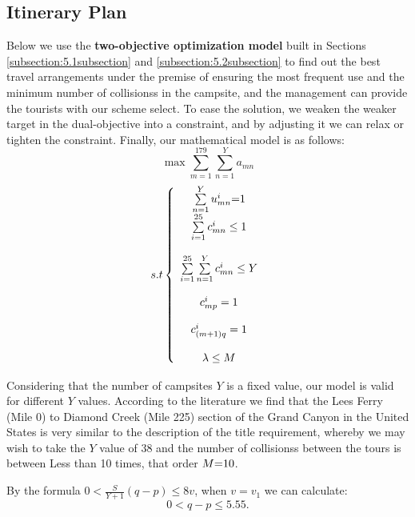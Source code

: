\subsection{Itinerary Plan}
\noindent Below we use the \textbf{two-objective optimization model} built in Sections \ref{subsection:5.1subsection} and \ref  {subsection:5.2subsection} to find out the best travel arrangements under the premise of ensuring the most frequent use and the minimum number of collisionss in the campsite, and the management can provide the tourists with our scheme select. To ease the solution, we weaken the weaker target in the dual-objective into a constraint, and by adjusting it we can relax or tighten the constraint. Finally, our mathematical model is as follows:
	\begin{equation}
	\max \sum\limits_{m = 1}^{179} {\sum\limits_{n = 1}^Y {{a_{mn}}} } \label{aa1}
	\end{equation}
	\begin{equation}
	s.t\left\{ {\begin{array}{*{20}{c}}
		{\sum\limits_{n = 1}^Y {u_{mn}^i} {\rm{ = }}1}\\
		{\sum\limits_{i = 1}^{25} {c_{mn}^i}  \le 1}\\
		\\
		{\sum\limits_{i = 1}^{25} {\sum\limits_{n = 1}^Y {c_{mn}^i \le Y} } }\\
		\\
		{c_{mp}^i = 1}\\
		\\
		{c_{(m + 1)q}^i = 1}\\
		\\
		{\lambda  \le M}
		\end{array}} \right.\label{aa1}
	\end{equation}
	\par Considering that the number of campsites $Y$ is a fixed value, our model is valid for different $Y$ values. According to the literature we find that the Lees Ferry (Mile 0) to Diamond Creek (Mile 225) section of the Grand Canyon in the United States is very similar to the description of the title requirement, whereby we may wish to take the $Y$ value of 38 and the number of collisionss between the tours is between Less than 10 times, that order $M{\rm{ = }}10$.
	\par By the formula $0 < \frac{S}{{Y + 1}}(q - p) \le 8v$, when $v = {v_1}$ we can calculate:
	\begin{equation}
	0 < q - p \le 5.55.\label{aa1}
	\end{equation}
